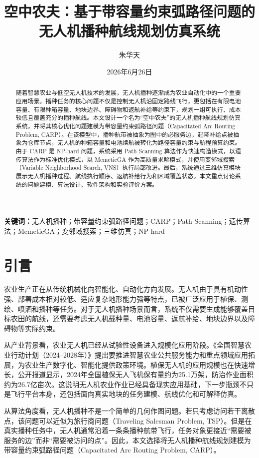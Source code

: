 \documentclass[UTF8,a4paper,12pt]{ctexart}
\title{\textbf{空中农夫：基于带容量约束弧路径问题的无人机播种航线规划仿真系统}}
\author{朱华天}
\date{2026年6月26日}
\begin{document}
\maketitle

\begin{abstract}
随着智慧农业与低空无人机技术的发展，无人机播种逐渐成为农业自动化中的一个重要应用场景。播种任务的核心问题不仅是控制无人机沿固定路线飞行，更包括在有限电池容量、有限种箱容量、地块边界、障碍物和返航补给等约束下，规划一组可执行、成本较低且覆盖充分的播种航线。本文设计一个名为“空中农夫”的无人机播种航线规划仿真系统，并将其核心优化问题建模为带容量约束弧路径问题（Capacitated Arc Routing Problem, CARP）。在该模型中，播种航带被抽象为图中的必服务边，起降补给点被抽象为仓库节点，无人机的种箱容量和电池续航被转化为路径容量约束与航程预算约束。由于 CARP 是 NP-hard 问题，系统采用 Path Scanning 算法作为快速构造模式，以遗传算法作为标准优化模式，以 MemeticGA 作为高质量求解模式，并使用变邻域搜索（Variable Neighborhood Search, VNS）执行局部改进。最后，系统通过三维仿真模块展示无人机播种过程、航线执行顺序、返航补给行为和区域覆盖状态。本文重点讨论系统的问题建模、算法设计、软件架构和实验评价方案。
\end{abstract}

\noindent\textbf{关键词：}无人机播种；带容量约束弧路径问题；CARP；Path Scanning；遗传算法；MemeticGA；变邻域搜索；三维仿真；NP-hard

\tableofcontents
\newpage

\section{引言}

农业生产正在从传统机械化向智能化、自动化方向发展。无人机由于具有机动性强、部署成本相对较低、适应复杂地形能力强等特点，已被广泛应用于植保、测绘、喷洒和播种等任务。对于无人机播种场景而言，系统不仅需要生成能够覆盖目标农田的航线，还需要考虑无人机载种量、电池容量、返航补给、地块边界以及障碍物等实际约束。

从产业背景看，农业无人机已经从试验性设备进入规模化应用阶段。《全国智慧农业行动计划（2024--2028年）》提出要推进智慧农业公共服务能力和重点领域应用拓展，为农业生产数字化、智能化提供政策环境\cite{moa2024smartagri}。植保无人机的应用规模也在快速增长，公开报道显示，2024年全国植保无人飞机保有量约为25.1万架，防治作业面积约为26.7亿亩次\cite{cau2024uav}。这说明无人机农业作业已经具备现实应用基础，下一步瓶颈不只是飞行平台本身，还包括面向真实地块的任务建模、航线优化和可解释仿真。

从算法角度看，无人机播种不是一个简单的几何作图问题。若只考虑访问若干离散点，该问题可以近似为旅行商问题（Traveling Salesman Problem, TSP）。但是在真实播种任务中，无人机通常沿着一条条播种航带飞行，任务对象更接近“需要被服务的边”而非“需要被访问的点”。因此，本文选择将无人机播种航线规划建模为带容量约束弧路径问题（Capacitated Arc Routing Problem, CARP）。
\end{document}

